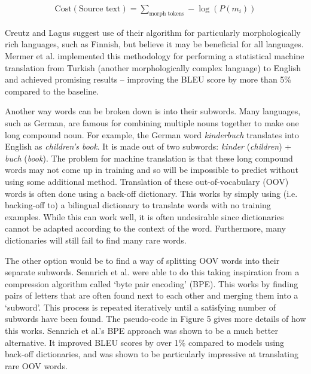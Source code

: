 \documentclass[11pt]{article}
\begin{document}
\begin{align}
    \textrm{Cost}(\textrm{Source text}) = \sum_{\textrm{morph tokens}} -\log(P(m_i))
\label{Morfessor-cost}
\end{align}

\bigskip

Creutz and Lagus suggest use of their algorithm for particularly morphologically rich languages, such as Finnish, but believe it may be beneficial for all languages. Mermer et al. \citeyearpar{mermer2010tubitak} implemented this methodology for performing a statistical machine translation from Turkish (another morphologically complex language) to English and achieved promising results -- improving the BLEU score by more than 5\% compared to the baseline.

\bigskip

Another way words can be broken down is into their subwords. Many languages, such as German, are famous for combining multiple nouns together to make one long compound noun. For example, the German word \textit{kinderbuch} translates into English as \textit{children’s book}. It is made out of two subwords: \textit{kinder} (\textit{children}) + \textit{buch} (\textit{book}). The problem for machine translation is that these long compound words may not come up in training and so will be impossible to predict without using some additional method. Translation of these out-of-vocabulary (OOV) words is often done using a back-off dictionary. This works by simply using (i.e. backing-off to) a bilingual dictionary to translate words with no training examples. While this can work well, it is often undesirable since dictionaries cannot be adapted according to the context of the word. Furthermore, many dictionaries will still fail to find many rare words.

\bigskip

The other option would be to find a way of splitting OOV words into their separate subwords. Sennrich et al. \citeyearpar{sennrich-etal-2016-neural} were able to do this taking inspiration from a compression algorithm called ‘byte pair encoding’ (BPE). This works by finding pairs of letters that are often found next to each other and merging them into a ‘subword’. This process is repeated iteratively until a satisfying number of subwords have been found. The pseudo-code in Figure 5 gives more details of how this works. Sennrich et al.'s BPE approach was shown to be a much better alternative. It improved BLEU scores by over 1\% compared to models using back-off dictionaries, and was shown to be particularly impressive at translating rare OOV words.
\end{document}

